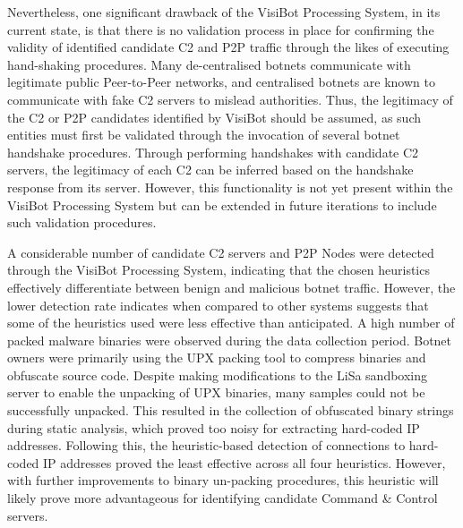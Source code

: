 Nevertheless, one significant drawback of the VisiBot Processing System, in its current state, is that there is no validation process in place for confirming the validity of identified candidate C2 and P2P traffic through the likes of executing hand-shaking procedures. Many de-centralised botnets communicate with legitimate public Peer-to-Peer networks, and centralised botnets are known to communicate with fake C2 servers to mislead authorities. Thus, the legitimacy of the C2 or P2P candidates identified by VisiBot should be assumed, as such entities must first be validated through the invocation of several botnet handshake procedures. Through performing handshakes with candidate C2 servers, the legitimacy of each C2 can be inferred based on the handshake response from its server. However, this functionality is not yet present within the VisiBot Processing System but can be extended in future iterations to include such validation procedures.

A considerable number of candidate C2 servers and P2P Nodes were detected through the VisiBot Processing System, indicating that the chosen heuristics effectively differentiate between benign and malicious botnet traffic. However, the lower detection rate indicates when compared to other systems suggests that some of the heuristics used were less effective than anticipated. A high number of packed malware binaries were observed during the data collection period. Botnet owners were primarily using the UPX packing tool \citep{UPX} to compress binaries and obfuscate source code. Despite making modifications to the LiSa sandboxing server to enable the unpacking of UPX binaries, many samples could not be successfully unpacked. This resulted in the collection of obfuscated binary strings during static analysis, which proved too noisy for extracting hard-coded IP addresses. Following this, the heuristic-based detection of connections to hard-coded IP addresses proved the least effective across all four heuristics. However, with further improvements to binary un-packing procedures, this heuristic will likely prove more advantageous for identifying candidate Command \& Control servers.


